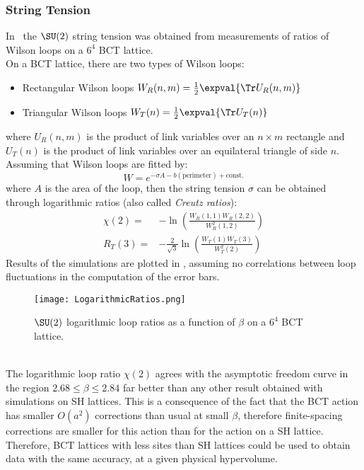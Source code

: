 \subsubsection{String Tension}
In~\cite{Celmaster:1983hs} the $\SU(2)$ string tension was obtained from measurements of ratios of Wilson loops on a $6^4$ BCT lattice.\\
On a BCT lattice, there are two types of Wilson loops:
\begin{itemize}
    \item Rectangular Wilson loops $W_R(n,m)=\frac12\expval{\Tr U_R(n,m)}$\
    \item Triangular Wilson loops $W_T(n)=\frac12\expval{\Tr U_T(n)}$
\end{itemize}
where $U_R(n,m)$ is the product of link variables over an $n\times m$ rectangle and $U_T(n)$ is the product of link variables over an equilateral triangle of side $n$.\\
Assuming that Wilson loops are fitted by:
\begin{equation}
    W = e^{-\sigma A -b(\text{perimeter}) +\text{const.}} \label{3:WilsonFit}
\end{equation}
where $A$ is the area of the loop, then the string tension $\sigma$ can be obtained through logarithmic ratios (also called \emph{Creutz ratios}):
\begin{align}
    \chi(2) =& -\ln(\frac{W_R(1,1)W_R(2,2)}{W_R^2(1,2)}) \\
    R_T(3) =& -\frac{2}{\sqrt3}\ln(\frac{W_T(1)W_T(3)}{W_T^2(2)})
\end{align}
Results of the simulations are plotted in , assuming no correlations between loop fluctuations in the computation of the error bars.
\begin{figure}[!htbp]
    \centering
    \texttt{[image: LogarithmicRatios.png]}
    \caption{$\SU(2)$ logarithmic loop ratios as a function of $\beta$ on a $6^4$ BCT lattice.}
    \label{3F:LogLoopRatios}
\end{figure}\\
The logarithmic loop ratio $\chi(2)$ agrees with the asymptotic freedom curve in the region $2.68\leq\beta\leq2.84$ far better than any other result obtained with simulations on SH lattices.
This is a consequence of the fact that the BCT action has smaller $O(a^2)$ corrections than usual at small $\beta$, therefore finite-spacing corrections are smaller for this action than for the action on a SH lattice.
Therefore, BCT lattices with less sites than SH lattices could be used to obtain data with the same accuracy, at a given physical hypervolume.\\

